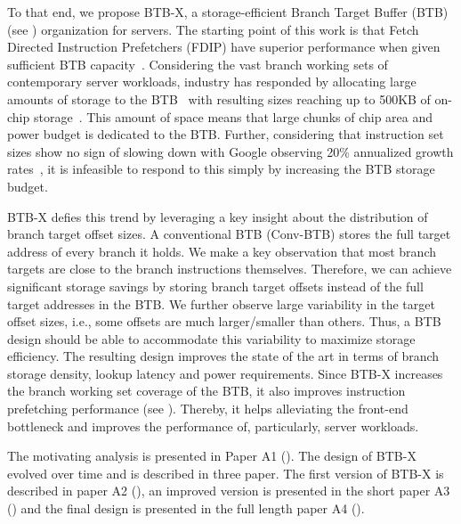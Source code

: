 \documentclass[../main.tex]{subfiles}
\begin{document}
\begin{refsection}
To that end, we propose BTB-X, a storage-efficient Branch Target
Buffer (BTB) (see ) organization for
servers.  The starting point of this work is that Fetch Directed Instruction
Prefetchers (FDIP) have superior performance when given sufficient BTB
capacity~\cite{ishii21_re_fetch_direc_instr_prefet}. Considering the
vast branch working sets of contemporary server workloads, industry
has responded by allocating large amounts of storage to the
BTB~\cite{neoverse,IBMz,zen2} with resulting sizes reaching up to
500KB of on-chip storage~\cite{exynos}. This amount of space means
that large chunks of chip area and power budget is dedicated to
the BTB. Further, considering that instruction set sizes show no sign
of slowing down with Google observing 20\% annualized growth
rates~\cite{kanev15_profil}, it is infeasible to respond to this
simply by increasing the BTB storage budget.

BTB-X defies this trend by leveraging a key insight about the
distribution of branch target offset sizes. A conventional BTB
(Conv-BTB) stores the full target address of every branch it holds. We
make a key observation that most branch targets are close to the branch
instructions themselves. Therefore, we can achieve significant storage savings 
by storing branch target offsets instead of the full target
addresses in the BTB. We further observe large variability in the target offset sizes,
i.e., some offsets are much larger/smaller than others. Thus, a BTB
design should be able to accommodate this variability to maximize storage efficiency. The resulting design improves the state of the art in terms of branch
storage density, lookup latency and power requirements. Since BTB-X
increases the branch working set coverage of the BTB, it also improves
instruction prefetching performance (see ). Thereby, it helps alleviating the
front-end bottleneck and improves the performance of, particularly,
server workloads.

The motivating analysis is presented in Paper A1 ().
The design of BTB-X evolved over time and is described in three paper. The first version of BTB-X is described in paper A2
(), an improved version is presented in the
short paper A3 () and the final design is
presented in the full length paper A4 ().


\end{refsection}
\end{document}
